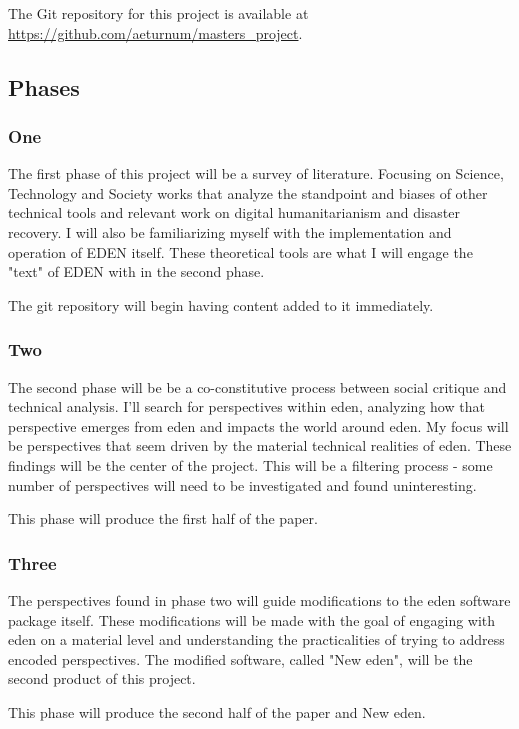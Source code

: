 \documentclass[a4paper,man,natbib]{apa6}
\begin{document}
   The Git repository for this project is available at \url{https://github.com/aeturnum/masters_project}.

   \subsection*{Phases}
   \subsubsection*{One}
   The first phase of this project will be a survey of literature. Focusing on Science, Technology and Society works that analyze the standpoint and biases of other technical tools and relevant work on digital humanitarianism and disaster recovery. I will also be familiarizing myself with the implementation and operation of EDEN itself. These theoretical tools are what I will engage the "text" of EDEN with in the second phase. 
   \begin{flushleft}
   The git repository will begin having content added to it immediately.
   \end{flushleft}
   \subsubsection*{Two}
   The second phase will be be a co-constitutive process between social critique and technical analysis. I'll search for perspectives within \acrshort{eden}, analyzing how that perspective emerges from \acrshort{eden} and impacts the world around \acrshort{eden}. My focus will be perspectives that seem driven by the material technical realities of \acrshort{eden}. These findings will be the center of the project. This will be a filtering process - some number of perspectives will need to be investigated and found uninteresting. 
   \begin{flushleft}
   This phase will produce the first half of the paper.
   \end{flushleft}
   \subsubsection*{Three}
   The perspectives found in phase two will guide modifications to the \acrshort{eden} software package itself. These modifications will be made with the goal of engaging with \acrshort{eden} on a material level and understanding the practicalities of trying to address encoded perspectives. The modified software, called "New \acrshort{eden}", will be the second product of this project.
   \begin{flushleft}
   This phase will produce the second half of the paper and New \acrshort{eden}.
   \end{flushleft}
\end{document}

